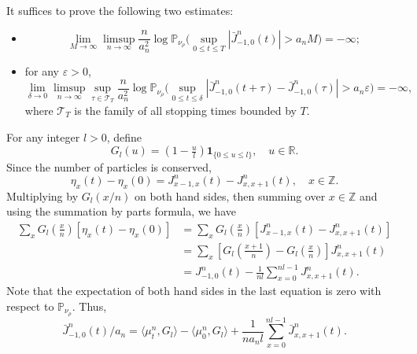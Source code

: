 \documentclass[reqno,11pt]{amsart}
\numberwithin{equation}{section}
\newcommand{\Pbb}{\mathbb{P}}
\newcommand{\Z}{\mathbb{Z}}
\begin{document}
It suffices to prove the following two estimates:
\begin{itemize}
	\item \begin{equation}\label{exp tight c1}
		\lim_{M \rightarrow \infty} \limsup_{n \rightarrow \infty} \frac{n}{a_n^2} \log \Pbb_{\nu_\rho} \Big( \sup_{0 \leq t \leq T} |\bar{J}^n_{-1,0} (t) | > a_n M\Big) = -\infty;
	\end{equation}
\item for any $\varepsilon > 0$,
\begin{equation}\label{exp tight c2}
\lim_{\delta \rightarrow 0} \limsup_{n \rightarrow \infty} \sup_{\tau \in \mathcal{T}_T} \frac{n}{a_n^2} \log \Pbb_{\nu_\rho} \Big(\sup_{0 \leq t \leq \delta} |\bar{J}^n_{-1,0} (t+\tau) - \bar{J}^n_{-1,0} (\tau)| >a_n \varepsilon\Big) = - \infty,
\end{equation}
where $\mathcal{T}_T$ is the family of all stopping times bounded by $T$. 
\end{itemize}

For any integer $l > 0$, define
\begin{equation}\label{G l}
	G_l(u)=(1-\tfrac{u}{l})\mathbf{1}_{\{0\leq u\leq l\}}, \quad u\in \mathbb{R}.
\end{equation}
Since the number of particles is conserved,
\begin{equation*}
	\eta_x (t) - \eta_x (0) = J^n_{x-1,x} (t) - J^n_{x,x+1} (t), \quad x \in \Z.
\end{equation*}
Multiplying by $G_l (x/n)$ on both hand sides, then summing over $x \in \Z$ and using the summation by parts formula, we have
\begin{equation}\label{current density filed relation}
	\begin{aligned}
		\sum_{x} G_l (\tfrac{x}{n}) [\eta_x (t) - \eta_x (0)] &= \sum_{x} G_l (\tfrac{x}{n}) [J^n_{x-1,x} (t) - J^n_{x,x+1} (t)]\\
		&= \sum_{x} [G_l (\tfrac{x+1}{n}) - G_l (\tfrac{x}{n})] J^n_{x,x+1} (t) \\
		&= J^n_{-1,0} (t) - \frac{1}{nl} \sum_{x=0}^{nl-1} J^n_{x,x+1} (t).
	\end{aligned}
\end{equation}
Note that the expectation of both hand sides in the last equation is zero with respect to $\Pbb_{\nu_\rho}$. Thus,
\begin{equation}\label{current decom}
\bar{J}^n_{-1,0} (t) / a_n = \langle \mu^n_t,G_l\rangle -\langle \mu^n_0,G_l  \rangle + \frac{1}{na_nl} \sum_{x=0}^{nl-1} \bar{J}^n_{x,x+1} (t).
\end{equation}
\end{document}
